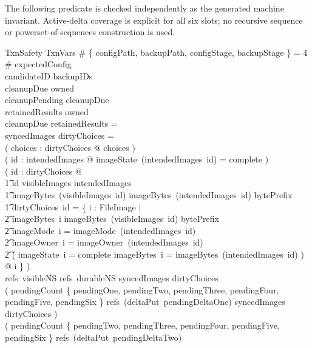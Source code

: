 \documentclass{article}
\begin{document}
The following predicate is checked independently as the generated machine
invariant.  Active-delta coverage is explicit for all six slots; no recursive
sequence or powerset-of-sequences construction is used.

\begin{schema}{TxnSafety}
	TxnVars
	\where
	\# \{ configPath, backupPath, configStage, backupStage \} = 4 \\
	\# expectedConfig  \\
	candidateID \notin backupIDs \\
	cleanupDue \subseteq owned \\
	cleanupPending \subseteq cleanupDue \\
	retainedResults \subseteq owned \\
	\dom cleanupDue \cap \dom retainedResults = \emptyset \\
	\dom syncedImages \cap \dom dirtyChoices = \emptyset \\
	( \forall choices : \ran dirtyChoices @ choices \neq \emptyset ) \\
	( \forall id : \dom intendedImages @
	imageState~(intendedImages~id) = complete ) \\
	( \forall id : \dom dirtyChoices @ \\
	\t1 id \in \dom visibleImages \cap \dom intendedImages \land \\
	\t1 imageBytes~(visibleImages~id) \mapsto
	imageBytes~(intendedImages~id) \in bytePrefix \land \\
	\t1 dirtyChoices~id = \{ i : FileImage | \\
	\t2 imageBytes~i \mapsto imageBytes~(visibleImages~id) \in bytePrefix \land \\
	\t2 imageMode~i = imageMode~(intendedImages~id) \land \\
	\t2 imageOwner~i = imageOwner~(intendedImages~id) \land \\
	\t2 ( imageState~i = complete \iff
	imageBytes~i = imageBytes~(intendedImages~id) ) @ i \} ) \\
	refs~visibleNS \cup refs~durableNS \subseteq
	\dom syncedImages \cup \dom dirtyChoices \\
	( pendingCount \in \{ pendingOne, pendingTwo, pendingThree, pendingFour,
	pendingFive, pendingSix \} \implies
	refs~(deltaPut~pendingDeltaOne) \subseteq
	\dom syncedImages \cup \dom dirtyChoices ) \\
	( pendingCount \in \{ pendingTwo, pendingThree, pendingFour, pendingFive,
	pendingSix \} \implies refs~(deltaPut~pendingDeltaTwo) \subseteq

\end{schema}
\end{document}
